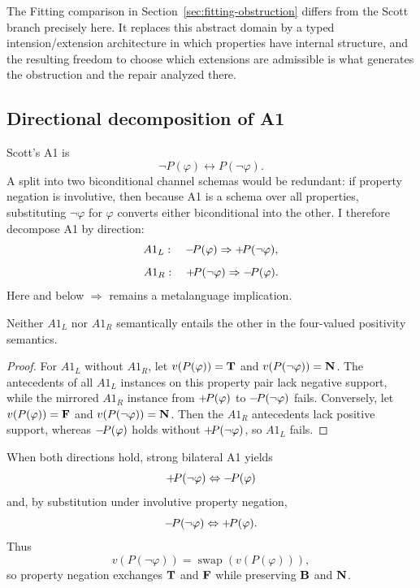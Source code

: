 The Fitting comparison in Section~\ref{sec:fitting-obstruction} differs from the Scott branch precisely here. It replaces this abstract domain by a typed intension/extension architecture in which properties have internal structure, and the resulting freedom to choose which extensions are admissible is what generates the obstruction and the repair analyzed there.

\subsection{Directional decomposition of A1}

Scott's A1 is
\[
  \neg P(\varphi)\leftrightarrow P(\neg\varphi).
\]
A split into two biconditional channel schemas would be redundant: if property negation is involutive, then because A1 is a schema over all properties, substituting \(\neg\varphi\) for \(\varphi\) converts either biconditional into the other. I therefore decompose A1 by direction:
\[
  A1_L:\quad -\!P(\varphi)\Rightarrow+\!P(\neg\varphi),
\]
\[
  A1_R:\quad +\!P(\neg\varphi)\Rightarrow-\!P(\varphi).
\]
Here and below \(\Rightarrow\) remains a metalanguage implication.

\begin{proposition}
Neither \(A1_L\) nor \(A1_R\) semantically entails the other in the four-valued positivity semantics.
\end{proposition}
\begin{proof}
For \(A1_L\) without \(A1_R\), let \(v(P(\varphi))=\mathbf{T}\) and \(v(P(\neg\varphi))=\mathbf{N}\). The antecedents of all \(A1_L\) instances on this property pair lack negative support, while the mirrored \(A1_R\) instance from \(+\!P(\varphi)\) to \(-\!P(\neg\varphi)\) fails. Conversely, let \(v(P(\varphi))=\mathbf{F}\) and \(v(P(\neg\varphi))=\mathbf{N}\). Then the \(A1_R\) antecedents lack positive support, whereas \(-\!P(\varphi)\) holds without \(+\!P(\neg\varphi)\), so \(A1_L\) fails.
\end{proof}

When both directions hold, strong bilateral A1 yields
\[
  +\!P(\neg\varphi)\Leftrightarrow-\!P(\varphi)
\]
and, by substitution under involutive property negation,
\[
  -\!P(\neg\varphi)\Leftrightarrow+\!P(\varphi).
\]
Thus
\[
  v(P(\neg\varphi))=\operatorname{swap}(v(P(\varphi))),
\]
so property negation exchanges \(\mathbf{T}\) and \(\mathbf{F}\) while preserving \(\mathbf{B}\) and \(\mathbf{N}\).

